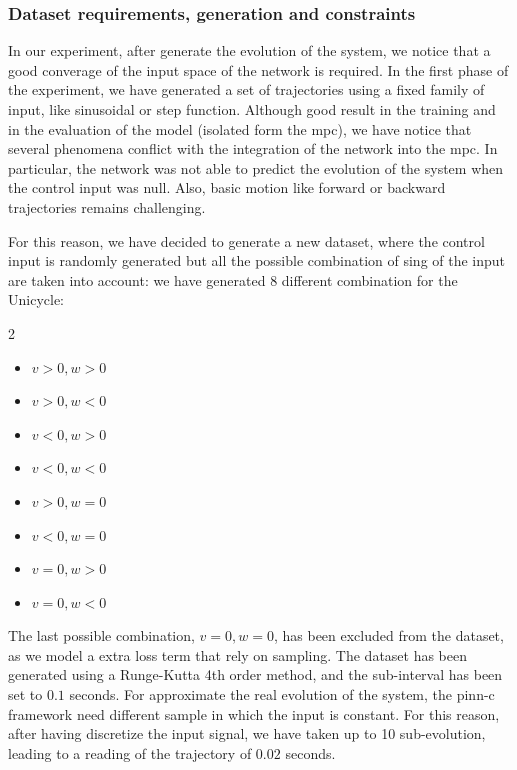 \subsubsection{Dataset requirements, generation and constraints}

In our experiment, after generate the evolution of the system, we notice that a good converage of the input space of the network is required.
In the first phase of the experiment, we have generated a set of trajectories using a fixed family of input, like sinusoidal or step function. 
Although good result in the training and in the evaluation of the model (isolated form the mpc), we have notice that several phenomena conflict with the integration of the network into the mpc.
In particular, the network was not able to predict the evolution of the system when the control input was null. Also, basic motion like forward or backward trajectories remains challenging.

For this reason, we have decided to generate a new dataset, where the control input is randomly generated but all the possible combination of sing of the input are taken into account:
we have generated 8 different combination for the Unicycle:
\begin{multicols}{2}
    \begin{itemize}
        \item $v > 0, w > 0$
        \item $v > 0, w < 0$
        \item $v < 0, w > 0$
        \item $v < 0, w < 0$
        \item $v > 0, w = 0$ 
        \item $v < 0, w = 0$
        \item $v = 0, w > 0$
        \item $v = 0, w < 0$
    \end{itemize}
    
\end{multicols}

The last possible combination, $v = 0, w = 0$, has been excluded from the dataset, as we model a extra loss term that rely on sampling.
The dataset has been generated using a Runge-Kutta 4th order method, and the sub-interval has been set to $0.1$ seconds. For approximate the real evolution of the system, 
the pinn-c framework need different sample in which the input is constant. For this reason, after having discretize the input signal, we have taken up to 10 sub-evolution, leading to a reading of the trajectory of $0.02$ seconds.

